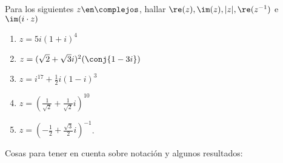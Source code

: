 \begin{enunciado}{\ejercicio}
  Para los siguientes $z \en \complejos$, hallar $\re(z), \im(z), |z|, \re(z^{-1})$ e $\im(i \cdot z)$
  \begin{multicols}{2}
    \begin{enumerate}[label=\roman*)]
      \item $z = 5 i (1+i)^4$
      \item $z = (\sqrt{2} + \sqrt{3} i)^2 (\conj{1 - 3i})$
      \item $z=i^{17} + \frac{1}{2} i (1 - i)^3$
      \item $z = \left(\frac{1}{\sqrt{2}} + \frac{1}{\sqrt{2}}i\right)^{10}$
      \item $z = \left(-\frac{1}{2} + \frac{\sqrt{3}}{2}i\right)^{-1}$.
    \end{enumerate}
  \end{multicols}
\end{enunciado}
Cosas para tener en cuenta sobre notación y algunos resultados:

